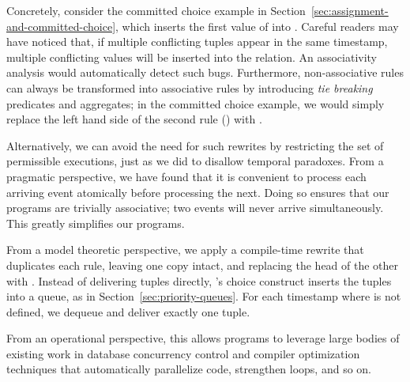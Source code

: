   Concretely, consider the committed choice
example in Section~\ref{sec:assignment-and-committed-choice}, which
inserts the first value of  into .
Careful readers may have noticed that, if multiple conflicting
 tuples appear in the same timestamp, multiple
conflicting values will be inserted into the  relation.
An associativity analysis would automatically detect such bugs.
Furthermore, non-associative rules can always be transformed 
into associative rules by introducing {\em tie breaking} predicates
and aggregates; in the committed choice example, we would simply
replace the left hand side of the second rule
() with .

Alternatively, we can avoid the need for such rewrites by restricting
the set of permissible executions, just as we did to disallow temporal
paradoxes.  From a pragmatic perspective, we have found that it is
convenient to process each arriving event atomically before processing
the next.  Doing so ensures that our programs are trivially
associative; two events will never arrive simultaneously.  This
greatly simplifies our programs.

From a model theoretic perspective, we apply a compile-time rewrite
that duplicates each  rule, leaving one copy intact,
and replacing the head of the other with .
Instead of delivering tuples directly, 's choice
construct inserts the tuples into a queue, as in
Section~\ref{sec:priority-queues}.  For each timestamp 
where  is not defined, we dequeue and deliver
exactly one tuple.

From an operational perspective, this allows \lang programs to
leverage large bodies of existing work in database concurrency control
and compiler optimization techniques that automatically parallelize
code, strengthen loops, and so on.  




